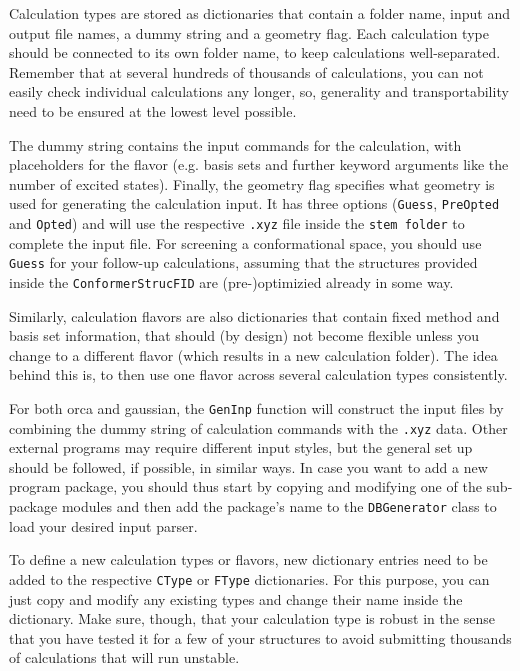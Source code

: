 \documentclass[12pt]{achemso}
\begin{document}
\noindent Calculation types are stored as dictionaries that contain a folder name, input and output file names, a dummy string and a geometry flag. Each calculation type should be connected to its own folder name, to keep calculations well-separated. Remember that at several hundreds of thousands of calculations, you can not easily check individual calculations any longer, so, generality and transportability need to be ensured at the lowest level possible.

\noindent The dummy string contains the input commands for the calculation, with placeholders for the flavor (e.g. basis sets and further keyword arguments like the number of excited states). Finally, the geometry flag specifies what geometry is used for generating the calculation input. It has three options (\texttt{Guess}, \texttt{PreOpted} and \texttt{Opted}) and will use the respective \texttt{.xyz} file inside the \texttt{stem folder} to complete the input file. For screening a conformational space, you should use \texttt{Guess} for your follow-up calculations, assuming that the structures provided inside the \texttt{ConformerStrucFID} are (pre-)optimizied already in some way.

\noindent Similarly, calculation flavors are also dictionaries that contain fixed method and basis set information, that should (by design) not become flexible unless you change to a different flavor (which results in a new calculation folder). The idea behind this is, to then use one flavor across several calculation types consistently.

\noindent For both orca\cite{orca_cite} and gaussian\cite{g16_cite}, the \texttt{GenInp} function will construct the input files by combining the dummy string of calculation commands with the \texttt{.xyz} data. Other external programs may require different input styles, but the general set up should be followed, if possible, in similar ways. In case you want to add a new program package, you should thus start by copying and modifying one of the sub-package modules and then add the package's name to the \texttt{DBGenerator} class to load your desired input parser.

\noindent To define a new calculation types or flavors, new dictionary entries need to be added to the respective \texttt{CType} or \texttt{FType} dictionaries. For this purpose, you can just copy and modify any existing types and change their name inside the dictionary. Make sure, though, that your calculation type is robust in the sense that you have tested it for a few of your structures to avoid submitting thousands of calculations that will run unstable. 
\end{document}
